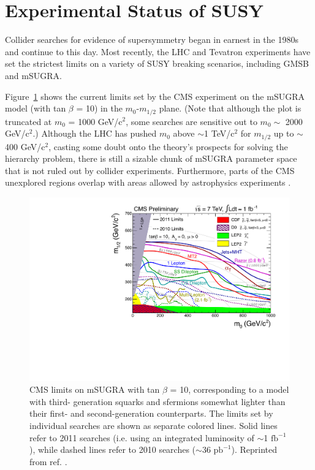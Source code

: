 \documentclass[dissertation.tex]{subfiles}
\begin{document}
\section{Experimental Status of SUSY}
\label{sec:Experimental Status of SUSY}

Collider searches for evidence of supersymmetry began in earnest in the 1980s \cite{PhysRevLett.54.1118,PhysRevD.35.374,Decamp1990291,PhysRevLett.75.613,PhysRevLett.75.618,Alexander1996273,springerlink:10.1007/BF02906978,Aid1996461,PhysRevLett.95.041802} and continue to this day.  Most recently, the LHC and Tevatron experiments have set the strictest limits on a variety of SUSY breaking scenarios, including GMSB and mSUGRA.

Figure~\ref{fig:CMS_SUSY_2011Limits_tanb10} shows the current limits set by the CMS experiment on the mSUGRA model (with tan $\beta$ = 10) in the $m_{0}$-$m_{1/2}$ plane.  (Note that although the plot is truncated at $m_{0}$ = 1000 GeV/$\mbox{c}^{2}$, some searches are sensitive out to $m_{0} \sim$ 2000 GeV/$\mbox{c}^{2}$.)  Although the LHC has pushed $m_{0}$ above $\sim$1 TeV/$\mbox{c}^{2}$ for $m_{1/2}$ up to $\sim$400 GeV/$\mbox{c}^{2}$, casting some doubt onto the theory's prospects for solving the hierarchy problem, there is still a sizable chunk of mSUGRA parameter space that is not ruled out by collider experiments.  Furthermore, parts of the CMS unexplored regions overlap with areas allowed by astrophysics experiments \cite{Buchmueller:1391061}.

\begin{figure}
	\centering
	\includegraphics[scale=0.6]{CMS_SUSY_2011Limits_tanb10}
	\caption{CMS limits on mSUGRA with tan $\beta$ = 10, corresponding to a model with third- generation squarks and sfermions somewhat lighter than their first- and second-generation counterparts.  The limits set by individual searches are shown as separate colored lines.  Solid lines refer to 2011 searches (i.e. using an integrated luminosity of $\sim$1 $\mbox{fb}^{-1}$), while dashed lines refer to 2010 searches ($\sim$36 $\mbox{pb}^{-1}$).  Reprinted from ref. \cite{CMS_mSUGRA}.}
	\label{fig:CMS_SUSY_2011Limits_tanb10}
\end{figure}
\end{document}
